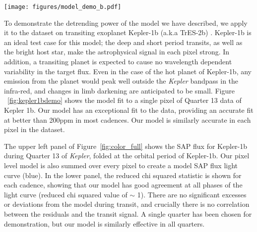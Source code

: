 \documentclass[iop]{emulateapj}
\newcommand{\kepler}{\emph{Kepler}\xspace}
\begin{document}



\begin{figure*}
    \centering
    \texttt{[image: figures/model\_demo\_b.pdf]}
    \caption{Example of the model fit described in Section~\ref{sec:model}. Shown is a single pixel of data from the Quarter 13 of transiting exoplanet Kepler-1b. (The model (blue) has been offset for clarity). Our model has excellent agreement with the data, as shown by the residuals in the lower panel. In this case we find our model typically has agreement at the $\sim$200$ppm$ level in each pixel. In order to build our full data-driven model, we produce models for every pixel in every quarter of \kepler data.}
    \label{fig:kepler1bdemo}
\end{figure*}

To demonstrate the detrending power of the model we have described, we apply it to the dataset on transiting exoplanet Kepler-1b (a.k.a TrES-2b) \citep{kepler1b}. Kepler-1b is an ideal test case for this model; the deep and short period transits, as well as the bright host star, make the astrophysical signal in each pixel strong. In addition, a transiting planet is expected to cause no wavelength dependent variability in the target flux. Even in the case of the hot planet of Kepler-1b, any emission from the planet would peak well outside the \kepler bandpass in the infra-red, and changes in limb darkening are anticipated to be small. Figure ~\ref{fig:kepler1bdemo} shows the model fit to a single pixel of Quarter 13 data of Kepler 1b. Our model has an exceptional fit to the data, providing an accurate fit at better than 200ppm in most cadences. Our model is similarly accurate in each pixel in the dataset.

The upper left panel of Figure~\ref{fig:color_full} shows the SAP flux for Kepler-1b during Quarter 13 of \kepler, folded at the orbital period of Kepler-1b. Our pixel level model is also summed over every pixel to create a model SAP flux light curve (blue). In the lower panel, the reduced chi squared statistic is shown for each cadence, showing that our model has good agreement at all phases of the light curve (reduced chi squared value of $\sim$ 1). There are no significant excesses or deviations from the model during transit, and crucially there is no correlation between the residuals and the transit signal. A single quarter has been chosen for demonstration, but our model is similarly effective in all quarters.
\end{document}
